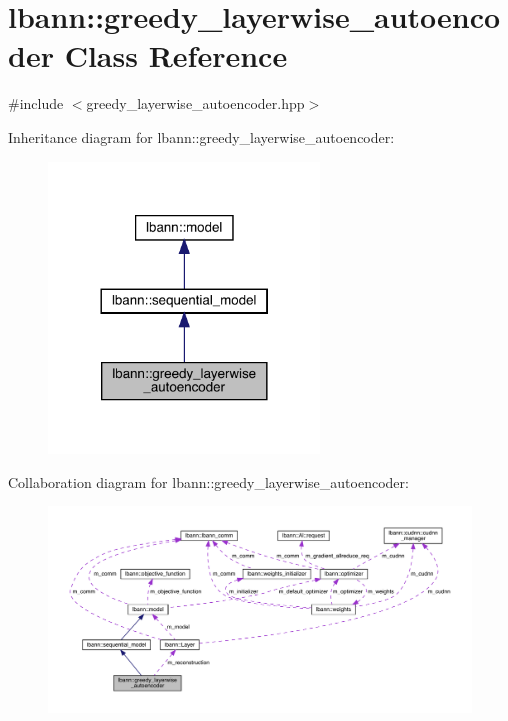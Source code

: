 \hypertarget{classlbann_1_1greedy__layerwise__autoencoder}{}\section{lbann\+:\+:greedy\+\_\+layerwise\+\_\+autoencoder Class Reference}
\label{classlbann_1_1greedy__layerwise__autoencoder}


{\ttfamily \#include $<$greedy\+\_\+layerwise\+\_\+autoencoder.\+hpp$>$}



Inheritance diagram for lbann\+:\+:greedy\+\_\+layerwise\+\_\+autoencoder\+:\nopagebreak
\begin{figure}[H]
\begin{center}
\leavevmode
\includegraphics[width=204pt]{classlbann_1_1greedy__layerwise__autoencoder__inherit__graph}
\end{center}
\end{figure}


Collaboration diagram for lbann\+:\+:greedy\+\_\+layerwise\+\_\+autoencoder\+:\nopagebreak
\begin{figure}[H]
\begin{center}
\leavevmode
\includegraphics[width=350pt]{classlbann_1_1greedy__layerwise__autoencoder__coll__graph}
\end{center}
\end{figure}
